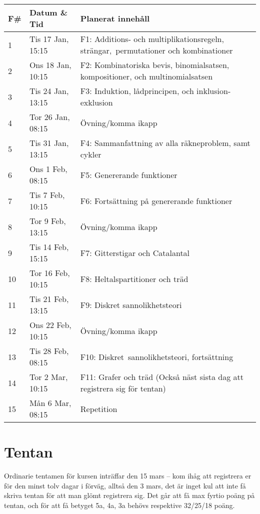 \documentclass{tufte-handout}
\begin{document}
\begin{table}[h]
\begin{tabularx}{\textwidth}{llX}
F\# & Datum \& Tid      & Planerat innehåll \\ 
\midrule
1            & Tis 17 Jan, 15:15 & F1: Additions- och multiplikationsregeln, strängar,\, permutationer och kombinationer\\
2            & Ons 18 Jan, 10:15 & F2: Kombinatoriska bevis, binomialsatsen, kompositioner, och multinomialsatsen\\
3            & Tis 24 Jan, 13:15 & F3: Induktion, lådprincipen, och inklusion-exklusion\\
4            & Tor 26 Jan, 08:15 & Övning/komma ikapp\\
5	      & Tis 31 Jan, 13:15 & F4: Sammanfattning av alla räkneproblem, samt cykler\\
6            & Ons 1 Feb, 08:15 & F5: Genererande funktioner\\
7            & Tis 7 Feb, 10:15  & F6: Fortsättning på genererande funktioner\\
8            & Tor 9 Feb, 13:15  & Övning/komma ikapp\\
9            & Tis 14 Feb, 15:15 & F7: Gitterstigar och Catalantal\\
10            & Tor 16 Feb, 10:15 & F8: Heltalspartitioner och träd\\
11            & Tis 21 Feb, 13:15 & F9: Diskret sannolikhetsteori\\
12           & Ons 22 Feb, 10:15 & Övning/komma ikapp\\
13           & Tis 28 Feb, 08:15 & F10: Diskret\, sannolikhetsteori, fortsättning\\
14           & Tor 2 Mar, 10:15  & F11: Grafer och träd (Också näst sista dag att registrera sig för tentan)\\
15           & Mån 6 Mar, 08:15 & Repetition
\end{tabularx}
\end{table}

\section{Tentan}

Ordinarie tentamen för kursen inträffar den 15 mars -- kom ihåg att registrera er för den minst tolv dagar i förväg, alltså den 3 mars, det är inget kul att inte få skriva tentan för att man glömt registrera sig. Det går att få max fyrtio poäng på tentan, och för att få betyget 5a, 4a, 3a behövs respektive 32/25/18 poäng.
\end{document}
